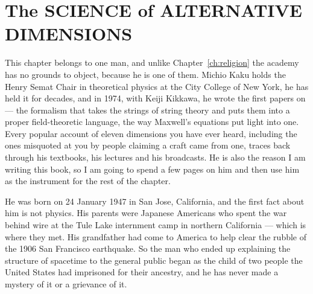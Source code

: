 \chapter{The SCIENCE of ALTERNATIVE DIMENSIONS}\label{ch:dimensions}


This chapter belongs to one man, and unlike Chapter~\ref{ch:religion} the academy has no grounds to
object, because he is one of them. Michio Kaku holds the Henry Semat Chair in theoretical physics
at the City College of New York, he has held it for decades, and in 1974, with Keiji Kikkawa, he
wrote the first papers on  --- the formalism that takes the strings of
string theory and puts them into a proper field-theoretic language, the way Maxwell's equations put
light into one. Every popular account of eleven dimensions you have ever heard, including the ones
misquoted at you by people claiming a craft came from one, traces back through his textbooks,
his lectures and his broadcasts. He is also the reason I am writing this book, so I am going to
spend a few pages on him and then use him as the instrument for the rest of the chapter.

He was born on 24 January 1947 in San Jose, California, and the first fact about him is not physics.
His parents were Japanese Americans who spent the war behind wire at the Tule Lake internment camp
in northern California --- which is where they met. His grandfather had come to America to help
clear the rubble of the 1906 San Francisco earthquake. So the man who ended up explaining the
structure of spacetime to the general public began as the child of two people the United States
had imprisoned for their ancestry, and he has never made a mystery of it or a grievance of it.

